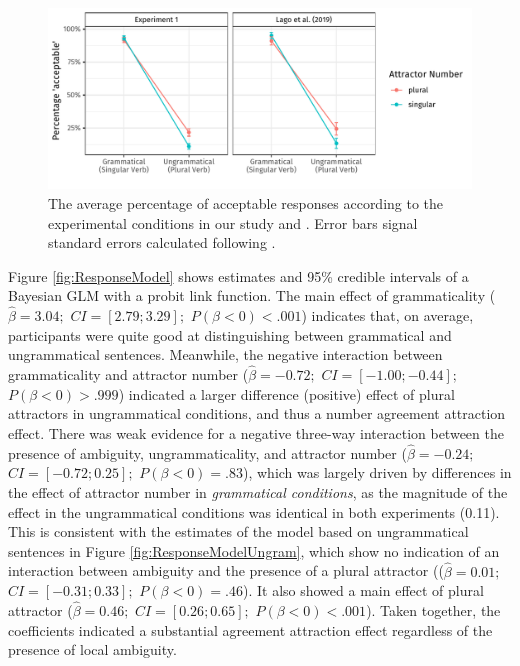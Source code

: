 \documentclass[apacite,linguex]{glossa}\usepackage[]{graphicx}\usepackage[]{color}
\makeatletter
\def\maxwidth{ %
  \ifdim\Gin@nat@width>\linewidth
    \linewidth
  \else
    \Gin@nat@width
  \fi
}
\newenvironment{knitrout}{}{} %
\makeatother
\begin{document}
\begin{figure}[hbt!]
\centering

\begin{knitrout}
\color{fgcolor}

{\centering \includegraphics[width=\maxwidth]{figure/AverageResponses-1} 

}


\end{knitrout}

\caption{The average percentage of acceptable responses according to the experimental conditions in our study and \citet{LagoEtAl:2019}. Error bars signal standard errors calculated following \citet{Morey:2008,Cousineau:2005}.}
\label{fig:AverageResponses}
\end{figure}


Figure \ref{fig:ResponseModel} shows estimates and 95\% credible intervals of a Bayesian GLM with a probit link function. The main effect of grammaticality ($\hat{\beta}=3.04;$ $CI=[2.79; 3.29];$ $P(\beta<0)< .001$) indicates that, on average, participants were quite good at distinguishing between grammatical and ungrammatical sentences. Meanwhile, the negative interaction between grammaticality and attractor number ($\hat{\beta}=-0.72;$ $CI=[-1.00; -0.44];$ $P(\beta<0)> .999$) indicated a larger difference (positive) effect of plural attractors in ungrammatical conditions, and thus a number agreement attraction effect. There was weak evidence for a negative three-way interaction between the presence of ambiguity, ungrammaticality, and attractor number ($\hat{\beta}=-0.24;$ $CI=[-0.72; 0.25];$ $P(\beta<0)=    .83$), which was largely driven by differences in the effect of attractor number in \textit{grammatical conditions}, as the magnitude of the effect in the ungrammatical conditions was identical in both experiments (0.11).  
This is consistent with the estimates of the model based on ungrammatical sentences in Figure \ref{fig:ResponseModelUngram}, which show no indication of an interaction between ambiguity and the presence of a plural attractor (($\hat{\beta}=0.01;$ $CI=[-0.31; 0.33];$ $P(\beta<0)=    .46$). It also showed a main effect of plural attractor ($\hat{\beta}=0.46;$ $CI=[0.26; 0.65];$ $P(\beta<0)< .001$). Taken together, the coefficients indicated a substantial agreement attraction effect regardless of the presence of local ambiguity.  
\end{document}
